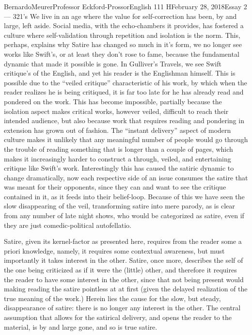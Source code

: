 \documentclass[12pt,letterpaper]{article}
\begin{document}
\begin{mla}{Bernardo}{Meurer}{Professor Eckford-Prossor}{English 111 H}{February 28, 2018}{Essay 2 --- 321's}
    We live in an age where the value for self-correction has been, by and large, left aside. Social media, with the echo-chambers it provides, has fostered a culture where self-validation through repetition and isolation is the norm. This, perhaps, explains why Satire has changed so much in it's form, we no longer see works like Swift's, or at least they don't rose to fame, because the fundamental dynamic that made it possible is gone. In Gulliver's Travels, we see Swift critique's of the English, and yet his reader is the Englishman himself. This is possible due to the ``veiled critique'' characteristic of his work, by which when the reader realizes he is being critiqued, it is far too late for he has already read and pondered on the work. This has become impossible, partially because the isolation aspect makes critical works, however veiled, difficult to reach their intended audience, but also because work that requires reading and pondering in extension has grown out of fashion. The ``instant delivery'' aspect of modern culture makes it unlikely that any meaningful number of people would go through the trouble of reading something that is longer than a couple of pages, which makes it increasingly harder to construct a through, veiled, and entertaining critique like Swift's work. Interestingly this has caused the satiric dynamic to change dramatically, now each respective side of an issue consumes the satire that was meant for their opponents, since they can and want to see the critique contained in it, as it feeds into their belief-loop. Because of this we have seen the slow disappearing of the veil, transforming satire into mere parody, as is clear from any number of late night shows, who would be categorized as satire, even if they are just comedic-political autofellatio.

    Satire, given its kernel-factor as presented here, requires from the reader some a priori knowledge, namely, it requires some contextual awareness, but must importantly it takes interest in the other. Satire, once more, describes the self of the one being criticized as if it were the (little) other, and therefore it requires the reader to have some interest in the other, since that not being present would making reading the satire pointless at at first (given the delayed realization of the true meaning of the work.) Herein lies the cause for the slow, but steady, disappearance of satire: there is no longer any interest in the other. The central assumption that allows for the satirical delivery, and opens the reader to the material, is by and large gone, and so is true satire.
\end{mla}
\end{document}
